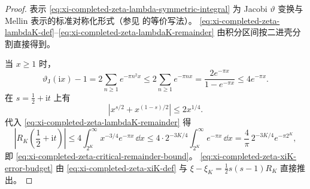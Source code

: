 \begin{proof}
表示 \eqref{eq:xi-completed-zeta-lambda-symmetric-integral} 为 Jacobi \(\vartheta\) 变换与 Mellin 表示的标准对称化形式（参见 \cite{Titchmarsh1986RiemannZeta} 的等价写法）。
\eqref{eq:xi-completed-zeta-lambdaK-def}--\eqref{eq:xi-completed-zeta-lambdaK-remainder} 由积分区间按二进壳分割直接得到。
\par
当 \(x\ge 1\) 时，
\[
\vartheta_{\mathrm J}(\mathrm{i}x)-1
=2\sum_{n\ge1}e^{-\pi n^2x}
\le 2\sum_{n\ge1}e^{-\pi nx}
=\frac{2e^{-\pi x}}{1-e^{-\pi x}}
\le 4e^{-\pi x}.
\]
在 \(s=\frac12+\mathrm{i}t\) 上有
\[
\left|x^{s/2}+x^{(1-s)/2}\right|
\le 2x^{1/4}.
\]
代入 \eqref{eq:xi-completed-zeta-lambdaK-remainder} 得
\[
\left|R_K\!\left(\frac12+\mathrm{i}t\right)\right|
\le 4\int_{2^K}^{\infty}x^{-3/4}e^{-\pi x}\,\dd x
\le
4\cdot 2^{-3K/4}\int_{2^K}^{\infty}e^{-\pi x}\,\dd x
=\frac{4}{\pi}\,2^{-3K/4}e^{-\pi 2^K},
\]
即 \eqref{eq:xi-completed-zeta-critical-remainder-bound}。
\eqref{eq:xi-completed-zeta-xiK-error-budget} 由 \eqref{eq:xi-completed-zeta-xiK-def} 与
\(
\xi-\xi_K=\frac12 s(s-1)R_K
\)
直接推出。
\end{proof}

